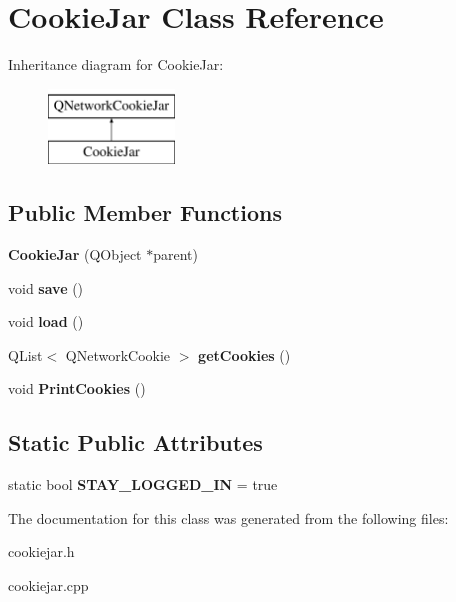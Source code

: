 \hypertarget{classCookieJar}{\section{Cookie\-Jar Class Reference}
\label{classCookieJar}
}
Inheritance diagram for Cookie\-Jar\-:\begin{figure}[H]
\begin{center}
\leavevmode
\includegraphics[height=2.000000cm]{classCookieJar}
\end{center}
\end{figure}
\subsection*{Public Member Functions}
\begin{DoxyCompactItemize}
\item 
\hypertarget{classCookieJar_a9d8362bfcc4d3fb2c5317de3305635a7}{{\bfseries Cookie\-Jar} (Q\-Object $\ast$parent)}\label{classCookieJar_a9d8362bfcc4d3fb2c5317de3305635a7}

\item 
\hypertarget{classCookieJar_aa36822f501cf36baf4984ce9920bfb75}{void {\bfseries save} ()}\label{classCookieJar_aa36822f501cf36baf4984ce9920bfb75}

\item 
\hypertarget{classCookieJar_ab58f94721665cfcf1eb24b140abe53f8}{void {\bfseries load} ()}\label{classCookieJar_ab58f94721665cfcf1eb24b140abe53f8}

\item 
\hypertarget{classCookieJar_aa887fb809d2206d4d03e623310fba49a}{Q\-List$<$ Q\-Network\-Cookie $>$ {\bfseries get\-Cookies} ()}\label{classCookieJar_aa887fb809d2206d4d03e623310fba49a}

\item 
\hypertarget{classCookieJar_ac2659e9f1aca758ba2b56bbde81a6e21}{void {\bfseries Print\-Cookies} ()}\label{classCookieJar_ac2659e9f1aca758ba2b56bbde81a6e21}

\end{DoxyCompactItemize}
\subsection*{Static Public Attributes}
\begin{DoxyCompactItemize}
\item 
\hypertarget{classCookieJar_a73f0b1e75f689e85ab833b0f1d680827}{static bool {\bfseries S\-T\-A\-Y\-\_\-\-L\-O\-G\-G\-E\-D\-\_\-\-I\-N} = true}\label{classCookieJar_a73f0b1e75f689e85ab833b0f1d680827}

\end{DoxyCompactItemize}


The documentation for this class was generated from the following files\-:\begin{DoxyCompactItemize}
\item 
cookiejar.\-h\item 
cookiejar.\-cpp\end{DoxyCompactItemize}
